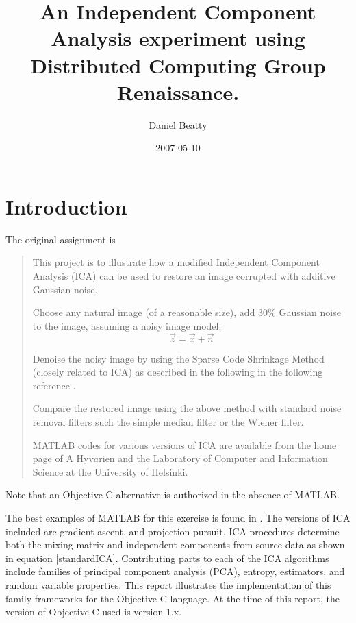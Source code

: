\documentclass[12pt ]{article}
\title{An Independent Component Analysis experiment using Distributed Computing Group Renaissance.}
\author{ Daniel Beatty }
\date{2007-05-10}
\begin{document}
\maketitle


\begin{abstract}
\end{abstract}

\section{Introduction}
The original assignment is 
\begin{quote}
	This project is to illustrate how a modified Independent Component Analysis (ICA) can be used to restore an image corrupted with additive Gaussian noise.    

	Choose any natural image (of a reasonable size), add 30\% Gaussian noise to the image, assuming a noisy image model:
	\begin{equation}
	\vec{z} = \vec{x} + \vec{n}
	\end{equation}
	
	Denoise the noisy image by using the Sparse Code Shrinkage Method (closely related to ICA) as described in the following in the following reference \cite{hyvarinen99sparse}. 
	
	Compare the restored image using the above method with standard noise removal filters such the simple median filter or the Wiener filter. 
	
	MATLAB codes for various versions of ICA are available from the home page of A Hyv$\ddot{a}$rien and the Laboratory of Computer and Information Science at the University of Helsinki. 
\end{quote}

Note that an Objective-C alternative is authorized in the absence of MATLAB. 

The best examples of MATLAB for this exercise is found in \cite[159-162]{stone-ica-tutorial}.  The versions of ICA included are gradient ascent, and projection pursuit.  %
ICA procedures determine both the mixing matrix and independent components from source data as shown in equation \ref{standardICA}.  
Contributing parts to each of the ICA algorithms include families of principal component analysis (PCA), entropy, estimators, and random variable properties.  This report illustrates the implementation of this family %
frameworks for the Objective-C language.  At the time of this report, the version of Objective-C used is version 1.x.  %
\end{document}
